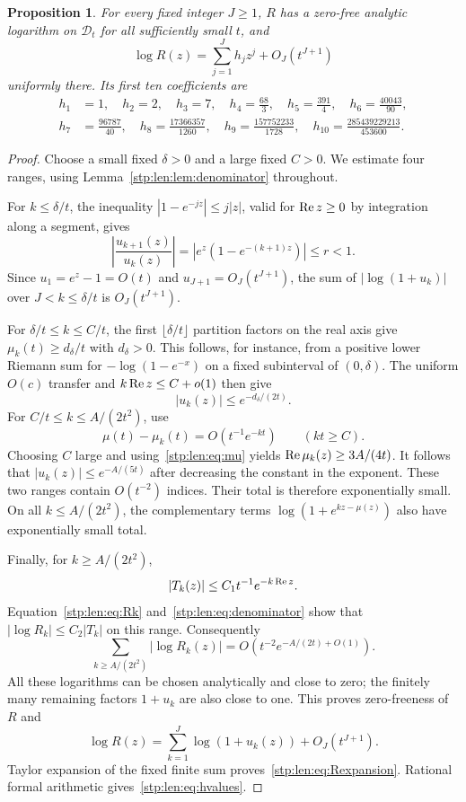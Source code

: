 \documentclass[11pt]{article}
\newtheorem{proposition}[theorem]{Proposition}
\theoremstyle{remark}\newtheorem{remark}[theorem]{Remark}
\begin{document}
\begin{proposition}\label{stp:len:prop:finiteend}
For every fixed integer $J\ge1$, $R$ has a zero-free analytic logarithm on $\mathcal D_t$ for all sufficiently small $t$, and
\begin{equation}\label{stp:len:eq:Rexpansion}
 \log R(z)=\sum_{j=1}^Jh_jz^j+O_J(t^{J+1})
\end{equation}
uniformly there. Its first ten coefficients are
\begin{equation}\label{stp:len:eq:hvalues}
\begin{split}
 h_1&=1,\quad h_2=2,\quad h_3=7,\quad h_4=\frac{68}{3},\quad
 h_5=\frac{391}{4},\quad h_6=\frac{40043}{90},\\
 h_7&=\frac{96787}{40},\quad h_8=\frac{17366357}{1260},\quad
 h_9=\frac{157752233}{1728},\quad h_{10}=\frac{285439229213}{453600}.
\end{split}
\end{equation}
\end{proposition}
\begin{proof}
Choose a small fixed $\delta>0$ and a large fixed $C>0$. We estimate four ranges, using Lemma~\ref{stp:len:lem:denominator} throughout.

For $k\le\delta/t$, the inequality $|1-e^{-jz}|\le j|z|$, valid for $\operatorname{Re} z\ge0$ by integration along a segment, gives
\[
 \left|\frac{u_{k+1}(z)}{u_k(z)}\right|
 =|e^z(1-e^{-(k+1)z})|\le r<1.
\]
Since $u_1=e^z-1=O(t)$ and $u_{J+1}=O_J(t^{J+1})$, the sum of $|\log(1+u_k)|$ over $J<k\le\delta/t$ is $O_J(t^{J+1})$.

For $\delta/t\le k\le C/t$, the first $\lfloor\delta/t\rfloor$ partition factors on the real axis give $\mu_k(t)\ge d_\delta/t$ with $d_\delta>0$. This follows, for instance, from a positive lower Riemann sum for $-\log(1-e^{-x})$ on a fixed subinterval of $(0,\delta)$. The uniform $O(c)$ transfer and $k\operatorname{Re} z\le C+o(1)$ then give
\[
 |u_k(z)|\le e^{-d_\delta/(2t)}.
\]
For $C/t\le k\le A/(2t^2)$, use
\[
 \mu(t)-\mu_k(t)=O(t^{-1}e^{-kt})\qquad(kt\ge C).
\]
Choosing $C$ large and using~\eqref{stp:len:eq:mu} yields $\operatorname{Re}\mu_k(z)\ge3A/(4t)$. It follows that $|u_k(z)|\le e^{-A/(5t)}$ after decreasing the constant in the exponent. These two ranges contain $O(t^{-2})$ indices. Their total is therefore exponentially small. On all $k\le A/(2t^2)$, the complementary terms $\log(1+e^{kz-\mu(z)})$ also have exponentially small total.

Finally, for $k\ge A/(2t^2)$,
\[
 |T_k(z)|\le C_1t^{-1}e^{-k\operatorname{Re} z}.
\]
Equation~\eqref{stp:len:eq:Rk} and~\eqref{stp:len:eq:denominator} show that $|\log R_k|\le C_2|T_k|$ on this range. Consequently
\[
 \sum_{k\ge A/(2t^2)}|\log R_k(z)|
 =O\left(t^{-2}e^{-A/(2t)+O(1)}\right).
\]
All these logarithms can be chosen analytically and close to zero; the finitely many remaining factors $1+u_k$ are also close to one. This proves zero-freeness of $R$ and
\[
 \log R(z)=\sum_{k=1}^J\log(1+u_k(z))+O_J(t^{J+1}).
\]
Taylor expansion of the fixed finite sum proves~\eqref{stp:len:eq:Rexpansion}. Rational formal arithmetic gives~\eqref{stp:len:eq:hvalues}.
\end{proof}
\end{document}
